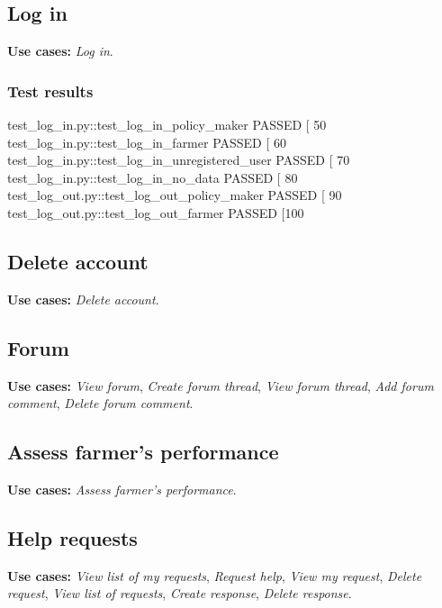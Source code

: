 \subsection{Log in}

\textbf{Use cases:} \textit{Log in}.

\subsubsection*{Test results}
\begin{verbnobox}[\footnotesize]
    test_log_in.py::test_log_in_policy_maker PASSED                          [ 50%
    test_log_in.py::test_log_in_farmer PASSED                                [ 60%
    test_log_in.py::test_log_in_unregistered_user PASSED                     [ 70%
    test_log_in.py::test_log_in_no_data PASSED                               [ 80%
    test_log_out.py::test_log_out_policy_maker PASSED                        [ 90%
    test_log_out.py::test_log_out_farmer PASSED                              [100%
\end{verbnobox}

\subsection{Delete account}

\textbf{Use cases:} \textit{Delete account}.

\subsection{Forum}

\textbf{Use cases:} \textit{View forum}, \textit{Create forum thread}, \textit{View forum thread}, \textit{Add forum comment}, \textit{Delete forum comment}.

\subsection{Assess farmer's performance}

\textbf{Use cases:} \textit{Assess farmer's performance}.

\subsection{Help requests}

\textbf{Use cases:} \textit{View list of my requests}, \textit{Request help}, \textit{View my request}, \textit{Delete request}, \textit{View list of requests}, \textit{Create response}, \textit{Delete response}.

